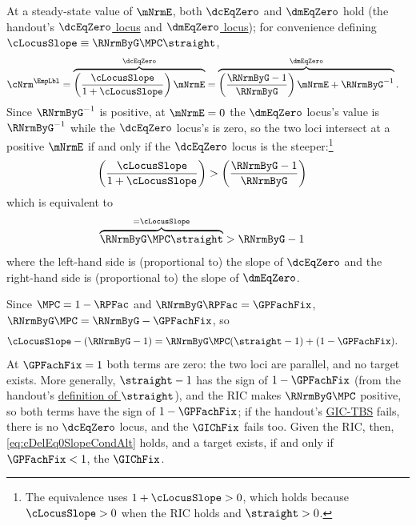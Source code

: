 \documentclass{econark}
\begin{document}
At a steady-state value of $\mNrmE$, both $\dcEqZero$ and $\dmEqZero$ hold (the handout's \hyperref[eq:cDelEqZero]{$\dcEqZero$ locus} and \hyperref[eq:mDelEqZero]{$\dmEqZero$ locus}); for convenience defining $\cLocusSlope \equiv \RNrmByG \MPC \straight$, 
\begin{equation}\begin{gathered}\begin{aligned}
  {\cNrm}^{\EmpLbl} = \overbrace{\left(\frac{\cLocusSlope}{1+\cLocusSlope}\right) \mNrmE}^{\dcEqZero} & =  \overbrace{\left(\frac{\RNrmByG-1}{\RNrmByG}\right)\mNrmE + \RNrmByG^{-1}}^{\dmEqZero} .
\end{aligned}\end{gathered}\end{equation}
Since $\RNrmByG^{-1}$ is positive, at $\mNrmE=0$ the $\dmEqZero$ locus's value is $\RNrmByG^{-1}$ while the $\dcEqZero$ locus's is zero, so the two loci intersect at a positive $\mNrmE$ if and only if the $\dcEqZero$ locus is the steeper:\footnote{The equivalence uses $1+\cLocusSlope > 0$, which holds because $\cLocusSlope > 0$ when the RIC holds and $\straight > 0$.}
\begin{equation}\begin{gathered}\begin{aligned}
  \left(\frac{\cLocusSlope}{1+\cLocusSlope}\right) & >  \left(\frac{\RNrmByG-1}{\RNrmByG}\right) \label{eq:cDelEq0SlopeCond}
\end{aligned}\end{gathered}\end{equation}
which is equivalent to 
\begin{equation}\begin{gathered}\begin{aligned}
  \overbrace{\RNrmByG \MPC \straight}^{= \cLocusSlope} & >   \RNrmByG-1  \label{eq:cDelEq0SlopeCondAlt}
\end{aligned}\end{gathered}\end{equation}
where the left-hand side is (proportional to) the slope of $\dcEqZero$ and the right-hand side is (proportional to) the slope of $\dmEqZero$.

Since $\MPC = 1-\RPFac$ and $\RNrmByG\RPFac = \GPFachFix$, $\RNrmByG\MPC = \RNrmByG-\GPFachFix$, so
\begin{equation}\begin{gathered}\begin{aligned}
  \cLocusSlope-(\RNrmByG-1) & = \RNrmByG\MPC(\straight-1)+(1-\GPFachFix) .
\end{aligned}\end{gathered}\end{equation}
At $\GPFachFix=1$ both terms are zero: the two loci are parallel, and no target exists.  More generally, $\straight-1$ has the sign of $1-\GPFachFix$ (from the handout's \hyperref[eq:straightDef]{definition of $\straight$}), and the RIC makes $\RNrmByG\MPC$ positive, so both terms have the sign of $1-\GPFachFix$; if the handout's \hyperref[eq:GICExistsSoln]{GIC-TBS} fails, there is no $\dcEqZero$ locus, and the $\GIChFix$ fails too.  Given the RIC, then, \eqref{eq:cDelEq0SlopeCondAlt} holds, and a target exists, if and only if $\GPFachFix < 1$, the $\GIChFix$.
\end{document}

